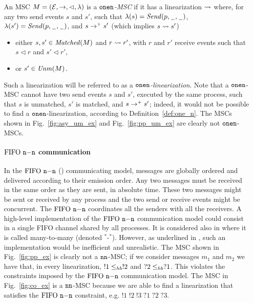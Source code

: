 \begin{definition}\label{def:one_n}
An MSC $M = (\mathcal{E},\to,\lhd,\lambda)$ is a \emph{$\mathtt{onen}$-MSC} if it has a linearization $\rightsquigarrow$ where, for any two send events $s$ and $s'$, such that $\lambda(s)={\mathit{Send}(p,\hspace{0.1em}\underline{\hspace{0.5em}}\hspace{0.1em},\hspace{0.1em}\underline{\hspace{0.5em}}\hspace{0.1em})}$, $\lambda(s')={\mathit{Send}(p,\hspace{0.1em}\underline{\hspace{0.5em}}\hspace{0.1em},\hspace{0.1em}\underline{\hspace{0.5em}}\hspace{0.1em})}$, and $s \to^+ s'$ (which implies $s \rightsquigarrow s'$)
\begin{itemize}%
	\item either $s,s' \in \mathit{Matched}(M)$ and $r \rightsquigarrow r'$, with  $r$ and $r'$   receive events such that $s \lhd r$ and $s' \lhd r'$,
	\item or $s' \in \mathit{Unm}(M)$.
\end{itemize}
\end{definition}

Such a linearization will be referred to as a \emph{$\mathtt{onen}$-linearization}. Note that a $\mathtt{onen}$-MSC cannot have two send events $s$ and $s'$, executed by the same process, such that $s$ is unmatched, $s'$ is matched, and $s \to^+ s'$; indeed, it would not be possible to find a $\mathtt{onen}$-linearization, according to Definition~\ref{def:one_n}. The MSCs shown in Fig.~\ref{fig:asy_um_ex} and Fig.~\ref{fig:pp_um_ex} are clearly not $\mathtt{onen}$-MSCs.


\paragraph{\bf  $\text{FIFO } \mathtt{n\mathsf{-}n}$ communication}
In the $\text{FIFO } \mathtt{n\mathsf{-}n}$ (\nnsymb) communicating model, messages are globally ordered and delivered according to  their emission order. Any two messages must be received in the same order as they are sent, in absolute time. These two messages might be sent or received by any process and the two send or receive events might be concurrent.
The $\text{FIFO } \mathtt{n\mathsf{-}n}$ coordinates all the senders with all the receivers. A high-level implementation of the $\text{FIFO } \mathtt{n\mathsf{-}n}$ communication model could consist in a single FIFO channel shared by all processes. It is considered also in \cite{DBLP:journals/tcs/BasuB16} where it is called  many-to-many (denoted $^\ast$-$^\ast$). However, as underlined in \cite{DBLP:journals/fac/ChevrouHQ16}, such an implementation would be inefficient and unrealistic.
The MSC shown in Fig.~\ref{fig:pp_ex} is clearly not a $\mathtt{nn}$-MSC; if we consider messages $m_1$ and $m_2$ we have that, in every linearization, $!1 \leq_{hb} !2$ and $?2 \leq_{hb} ?1$. This violates the constraints imposed by the $\text{FIFO } \mathtt{n\mathsf{-}n}$ communication model. The MSC in Fig.~\ref{fig:co_ex} is a $\mathtt{nn}$-MSC because we are able to find a linearization that satisfies the $\text{FIFO } \mathtt{n\mathsf{-}n}$ constraint, e.g. $!1\;!2\;!3\;?1\;?2\;?3$.

